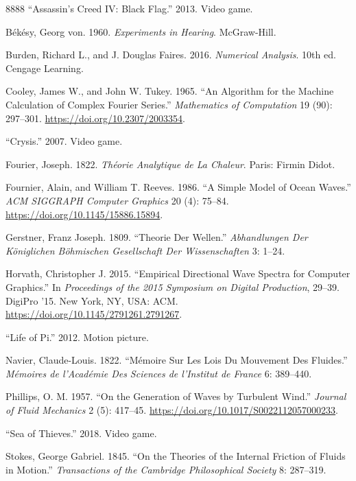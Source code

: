 \begin{thebibliography}{8888}
{``Assassin's Creed IV: Black Flag.''} 2013. Video game.

Békésy, Georg von. 1960. \emph{Experiments in Hearing}. McGraw-Hill.

Burden, Richard L., and J. Douglas Faires. 2016. \emph{Numerical
Analysis}. 10th ed. Cengage Learning.

Cooley, James W., and John W. Tukey. 1965. {``An Algorithm for the
Machine Calculation of Complex Fourier Series.''} \emph{Mathematics of
Computation} 19 (90): 297--301. \url{https://doi.org/10.2307/2003354}.

{``Crysis.''} 2007. Video game.

Fourier, Joseph. 1822. \emph{Th{é}orie Analytique de La Chaleur}. Paris:
Firmin Didot.

Fournier, Alain, and William T. Reeves. 1986. {``A Simple Model of Ocean
Waves.''} \emph{ACM SIGGRAPH Computer Graphics} 20 (4): 75--84.
\url{https://doi.org/10.1145/15886.15894}.

Gerstner, Franz Joseph. 1809. {``Theorie Der Wellen.''}
\emph{Abhandlungen Der Königlichen Böhmischen Gesellschaft Der
Wissenschaften} 3: 1--24.

Horvath, Christopher J. 2015. {``Empirical Directional Wave Spectra for
Computer Graphics.''} In \emph{Proceedings of the 2015 Symposium on
Digital Production}, 29--39. DigiPro '15. New York, NY, USA: ACM.
\url{https://doi.org/10.1145/2791261.2791267}.

{``Life of Pi.''} 2012. Motion picture.

Navier, Claude-Louis. 1822. {``Mémoire Sur Les Lois Du Mouvement Des
Fluides.''} \emph{Mémoires de l'Académie Des Sciences de l'Institut de
France} 6: 389--440.

Phillips, O. M. 1957. {``On the Generation of Waves by Turbulent
Wind.''} \emph{Journal of Fluid Mechanics} 2 (5): 417--45.
\url{https://doi.org/10.1017/S0022112057000233}.

{``Sea of Thieves.''} 2018. Video game.

Stokes, George Gabriel. 1845. {``On the Theories of the Internal
Friction of Fluids in Motion.''} \emph{Transactions of the Cambridge
Philosophical Society} 8: 287--319.


\end{thebibliography}
